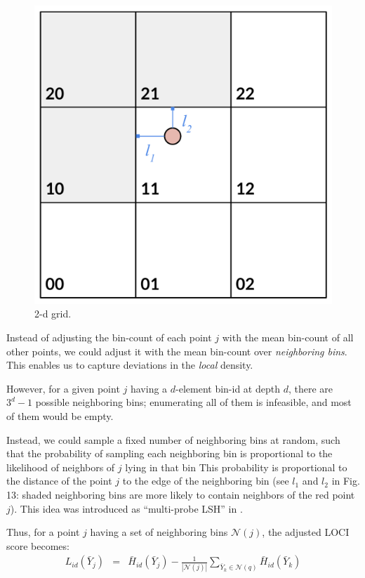 \documentclass[11pt,onecolumn]{article}
\begin{document}
\begin{figure}
    \centering
		\includegraphics[width=\linewidth]{fig/grid.pdf}
    \caption{2-d grid.}
\end{figure}
Instead of adjusting the bin-count of each point $j$ with the mean bin-count of all other points, we could adjust it with the mean bin-count over \textit{neighboring bins}. This enables us to capture deviations in the \textit{local} density.

However, for a given point $j$ having a $d$-element bin-id at depth $d$, there are $3^d -1$ possible neighboring bins; enumerating all of them is infeasible, and most of them would be empty.

Instead, we could sample a fixed number of neighboring bins at random, such that the probability of sampling each neighboring bin is proportional to the likelihood of neighbors of $j$ lying in that bin This probability is proportional to the distance of the point $j$ to the edge of the neighboring bin (see $l_1$ and $l_2$ in Fig. 13: shaded neighboring bins are more likely to contain neighbors of the red point $j$). This idea was introduced as ``multi-probe LSH'' in \parencite{lv2007multi}.

Thus, for a point $j$ having a set of neighboring bins $\mathcal{N}(j)$, the adjusted LOCI score becomes:
\begin{eqnarray}
	L_{id}(\bar{Y}_j) &=& \bar{H}_{id}(\bar{Y}_j) - \frac{1}{|\mathcal{N}(j)|}\sum_{\bar{Y}_k \in \mathcal{N}(q)}\bar{H}_{id}(\bar{Y}_k)
\end{eqnarray}
\end{document}
